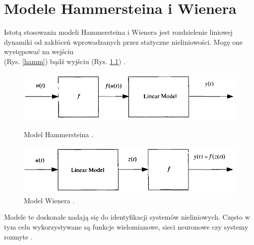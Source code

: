 \chapter{Modele Hammersteina i Wienera}
Istotą stosowania modeli Hammersteina i Wienera jest rozdzielenie liniowej dynamiki od zakłóceń wprowadzanych przez statyczne nieliniowości. Mogę one występować na wejściu \\ (Rys. \ref{hamm}) bądź wyjściu (Rys. \ref{wien}) \cite{10}.
\vspace{0.5cm}
\begin{figure}[h!]
\centering
\includegraphics[width=\textwidth]{pictures/hammerstein}
\caption{Model Hammersteina \cite{21}.}
\label{hamm}

\vspace{0.5cm}

\includegraphics[width=\textwidth]{pictures/wiener}
\caption{Model Wienera \cite{21}.}
\label{wien}
\end{figure}

Modele te doskonale nadają się do identyfikacji systemów nieliniowych. Często w tym celu wykorzystywane są funkcje wielomianowe, sieci neuronowe czy systemy rozmyte \cite{150}.